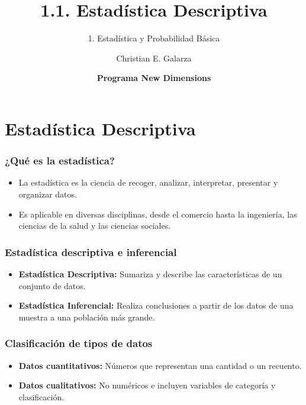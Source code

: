 \documentclass[aspectratio=169]{beamer}
\title[1.1. Estadística Descriptiva]{\Huge 1.1. Estadística Descriptiva}
\subtitle{1. Estadística y Probabilidad Básica}
\author{Christian E. Galarza}
\date{\bf Programa New Dimensions}
\begin{document}
\frame{\titlepage}

\section{Estadística Descriptiva}

\begin{frame}
\frametitle{¿Qué es la estadística?}

\begin{itemize}
    \item La estadística es la ciencia de recoger, analizar, interpretar, presentar y organizar datos. 
    \item Es aplicable en diversas disciplinas, desde el comercio hasta la ingeniería, las ciencias de la salud y las ciencias sociales.
\end{itemize}

\end{frame}

\begin{frame}
\frametitle{Estadística descriptiva e inferencial}

\begin{itemize}
    \item \textbf{Estadística Descriptiva:} Sumariza y describe las características de un conjunto de datos.
    \item \textbf{Estadística Inferencial:} Realiza conclusiones a partir de los datos de una muestra a una población más grande.
\end{itemize}

\end{frame}

\begin{frame}
\frametitle{Clasificación de tipos de datos}

\begin{itemize}
    \item \textbf{Datos cuantitativos:} Números que representan una cantidad o un recuento.
    \item \textbf{Datos cualitativos:} No numéricos e incluyen variables de categoría y clasificación.
\end{itemize}




\end{frame}
\end{document}
